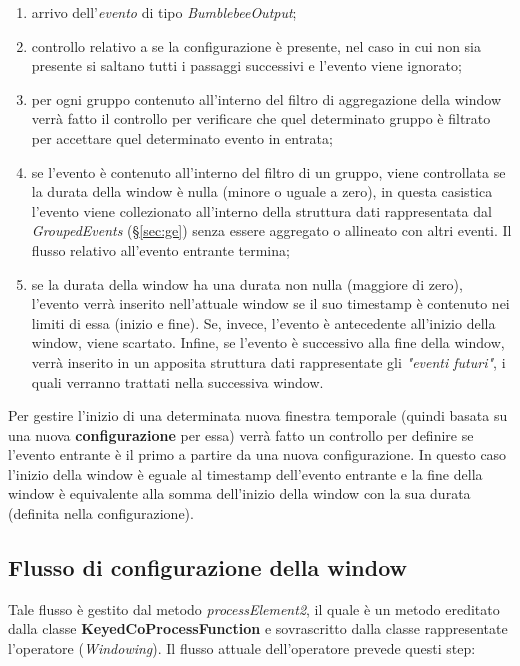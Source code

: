 \begin{enumerate}
	\item{arrivo dell'\textit{evento} di tipo \textit{BumblebeeOutput};}
	\item{controllo relativo a se la configurazione è presente, nel caso in cui non sia presente si saltano tutti i passaggi successivi e l'evento viene ignorato;}
	\item{per ogni gruppo contenuto all'interno del filtro di aggregazione della window verrà fatto il controllo per verificare che quel determinato gruppo è filtrato per accettare quel determinato evento in entrata;}
\item{se l'evento è contenuto all'interno del filtro di un gruppo, viene controllata se la durata della window è nulla (minore o uguale a zero), in questa casistica l'evento viene collezionato all'interno della struttura dati rappresentata dal \textit{GroupedEvents} (\S\ref{sec:ge}) senza essere aggregato o allineato con altri eventi. Il flusso relativo all'evento entrante termina;}
\item{se la durata della window ha una durata non nulla (maggiore di zero), l'evento verrà inserito nell'attuale window se il suo \gls{timestamp} è contenuto nei limiti di essa (inizio e fine). Se, invece, l'evento è antecedente all'inizio della window, viene scartato. Infine, se l'evento è successivo alla fine della window, verrà inserito in un apposita struttura dati rappresentate gli \textit{"eventi futuri"}, i quali verranno trattati nella successiva window.}
\end{enumerate}

Per gestire l'inizio di una determinata nuova finestra temporale (quindi basata su una nuova \textbf{configurazione} per essa) verrà fatto un controllo per definire se l'evento entrante è il primo a partire da una nuova configurazione. In questo caso l'inizio della window è eguale al \gls{timestamp} dell'evento entrante e la fine della window è equivalente alla somma dell'inizio della window con la sua durata (definita nella configurazione).
\subsection{Flusso di configurazione della window}\label{sec:pr2-windowing}
Tale flusso è gestito dal metodo \textit{processElement2}, il quale è un metodo ereditato dalla classe \textbf{KeyedCoProcessFunction} e sovrascritto dalla classe rappresentate l'operatore (\textit{Windowing}). Il flusso attuale dell'operatore prevede questi step:


